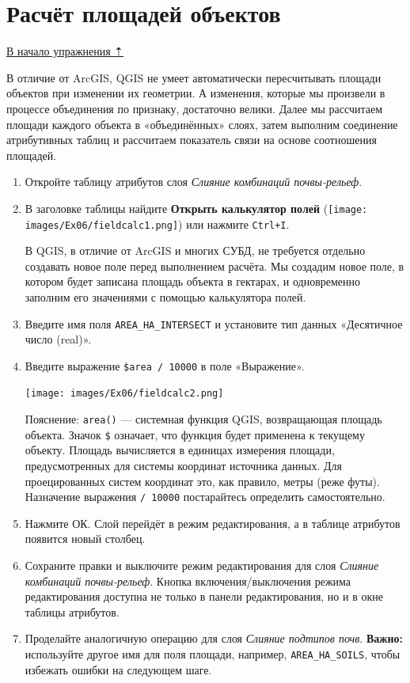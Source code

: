 \documentclass[
  12pt,
]{book}
\begin{document}
\hypertarget{overlay-fieldcalc}{%
\section{Расчёт площадей объектов}\label{overlay-fieldcalc}}

\protect\hyperlink{overlay}{В начало упражнения ⇡}

В отличие от ArcGIS, QGIS не умеет автоматически пересчитывать площади объектов при изменении их геометрии. А изменения, которые мы произвели в процессе объединения по признаку, достаточно велики. Далее мы рассчитаем площади каждого объекта в «объединённых» слоях, затем выполним соединение атрибутивных таблиц и рассчитаем показатель связи на основе соотношения площадей.

\begin{enumerate}
\def\labelenumi{\arabic{enumi}.}
\item
  Откройте таблицу атрибутов слоя \emph{Слияние комбинаций почвы-рельеф}.
\item
  В заголовке таблицы найдите \textbf{Открыть калькулятор полей} (\texttt{[image: images/Ex06/fieldcalc1.png]}) или нажмите \texttt{Ctrl+I}.

  В QGIS, в отличие от ArcGIS и многих СУБД, не требуется отдельно создавать новое поле перед выполнением расчёта. Мы создадим новое поле, в котором будет записана площадь объекта в гектарах, и одновременно заполним его значениями с помощью калькулятора полей.
\item
  Введите имя поля \texttt{AREA\_HA\_INTERSECT} и установите тип данных «Десятичное число (real)».
\item
  Введите выражение \texttt{\$area\ /\ 10000} в поле «Выражение».

  \texttt{[image: images/Ex06/fieldcalc2.png]}

  Пояснение: \texttt{area()} --- системная функция QGIS, возвращающая площадь объекта. Значок \texttt{\$} означает, что функция будет применена к текущему объекту. Площадь вычисляется в единицах измерения площади, предусмотренных для системы координат источника данных. Для проецированных систем координат это, как правило, метры (реже футы). Назначение выражения \texttt{/\ 10000} постарайтесь определить самостоятельно.
\item
  Нажмите ОК. Слой перейдёт в режим редактирования, а в таблице атрибутов появится новый столбец.
\item
  Сохраните правки и выключите режим редактирования для слоя \emph{Слияние комбинаций почвы-рельеф}. Кнопка включения/выключения режима редактирования доступна не только в панели редактирования, но и в окне таблицы атрибутов.
\item
  Проделайте аналогичную операцию для слоя \emph{Слияние подтипов почв}. \textbf{Важно:} используйте другое имя для поля площади, например, \texttt{AREA\_HA\_SOILS}, чтобы избежать ошибки на следующем шаге.
\end{enumerate}
\end{document}
